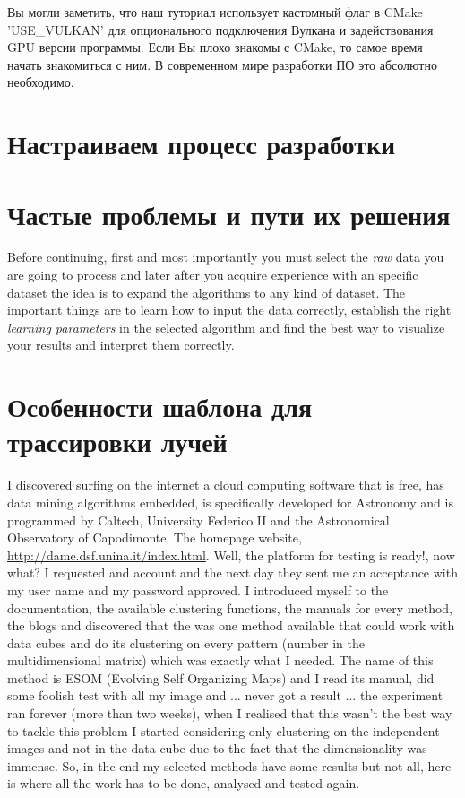 \documentclass[11pt,fleqn,english,russian]{report} %
\begin{document}
\begin{remark} 
Вы могли заметить, что наш туториал использует кастомный флаг в CMake 'USE\_VULKAN' для опционального подключения Вулкана и задействования GPU версии программы. Если Вы плохо знакомы с CMake, то самое время начать знакомиться с ним. В современном мире разработки ПО это абсолютно необходимо. 
\end{remark}

\chapter{Настраиваем процесс разработки}


\chapter{Частые проблемы и пути их решения}

Before continuing, first and most importantly you must select the \emph{raw} data you are going to process and later after you acquire experience with an specific dataset the idea is to expand the algorithms to any kind of dataset. The important things are to learn how to input the data correctly, establish the right \emph{learning parameters} in the selected algorithm and find the best way to visualize your results and interpret them correctly.


\chapter{Особенности шаблона для трассировки лучей}

I discovered surfing on the internet a cloud computing software that is free, has data mining algorithms embedded, is specifically developed for Astronomy and is programmed by Caltech, University Federico II and the Astronomical Observatory of Capodimonte. The homepage website, \url{http://dame.dsf.unina.it/index.html}. Well, the platform for testing is ready!, now what? I requested and account and the next day they sent me an acceptance with my user name and my password approved.
I introduced myself to the documentation, the available clustering functions, the manuals for every method, the blogs and discovered that the was one method available that could work with data cubes and do its clustering on every pattern (number in the multidimensional matrix) which was exactly what I needed. The name of this method is ESOM (Evolving Self Organizing Maps) and I read its manual, did some foolish test with all my image and ... never got a result ... the experiment ran forever (more than two weeks), when I realised that this wasn't the best way to tackle this problem I started considering only clustering on the independent images and not in the data cube due to the fact that the dimensionality was immense. So, in the end my selected methods have some results but not all, here is where all the work has to be done, analysed and tested again.
\end{document}
